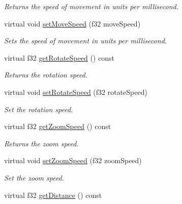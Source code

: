 \begin{DoxyCompactItemize}
\begin{DoxyCompactList}\small\item\em Returns the speed of movement in units per millisecond. \end{DoxyCompactList}\item 
virtual void \hyperlink{classirr_1_1scene_1_1_c_scene_node_animator_camera_maya_a13dec037830d892e79066db262996ae8}{set\-Move\-Speed} (f32 move\-Speed)
\begin{DoxyCompactList}\small\item\em Sets the speed of movement in units per millisecond. \end{DoxyCompactList}\item 
virtual f32 \hyperlink{classirr_1_1scene_1_1_c_scene_node_animator_camera_maya_a958d577d57a9dc6566fc59eb17095ec1}{get\-Rotate\-Speed} () const 
\begin{DoxyCompactList}\small\item\em Returns the rotation speed. \end{DoxyCompactList}\item 
virtual void \hyperlink{classirr_1_1scene_1_1_c_scene_node_animator_camera_maya_aadedf9450e7013cc1ee959237ebc1616}{set\-Rotate\-Speed} (f32 rotate\-Speed)
\begin{DoxyCompactList}\small\item\em Set the rotation speed. \end{DoxyCompactList}\item 
virtual f32 \hyperlink{classirr_1_1scene_1_1_c_scene_node_animator_camera_maya_a7eb7055eb23c1fd751304c2c9eb56c9d}{get\-Zoom\-Speed} () const 
\begin{DoxyCompactList}\small\item\em Returns the zoom speed. \end{DoxyCompactList}\item 
virtual void \hyperlink{classirr_1_1scene_1_1_c_scene_node_animator_camera_maya_a38f299afc6344b6bfdb7d51a17e91aab}{set\-Zoom\-Speed} (f32 zoom\-Speed)
\begin{DoxyCompactList}\small\item\em Set the zoom speed. \end{DoxyCompactList}\item 
\hypertarget{classirr_1_1scene_1_1_c_scene_node_animator_camera_maya_a26cc38ec5f56b7785882f5e8ffdbf4c8}{virtual f32 \hyperlink{classirr_1_1scene_1_1_c_scene_node_animator_camera_maya_a26cc38ec5f56b7785882f5e8ffdbf4c8}{get\-Distance} () const }\label{classirr_1_1scene_1_1_c_scene_node_animator_camera_maya_a26cc38ec5f56b7785882f5e8ffdbf4c8}


\end{DoxyCompactItemize}
